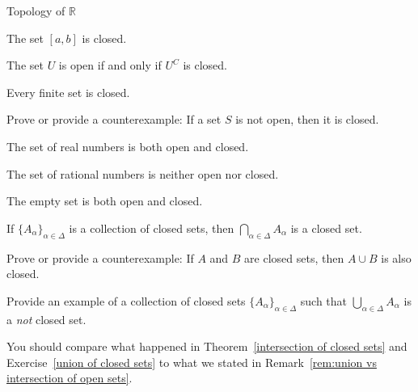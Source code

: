 \begin{section}{Topology of $\mathbb{R}$}
\begin{exercise}
\end{exercise}

\begin{theorem}
The set $[a,b]$ is closed.
\end{theorem}

\begin{theorem}
The set $U$ is open if and only if $U^C$ is closed.
\end{theorem}

\begin{theorem}
Every finite set is closed.
\end{theorem}

\begin{problem}
Prove or provide a counterexample: If a set $S$ is not open, then it is closed.
\end{problem}

\begin{theorem}
The set of real numbers is both open and closed.
\end{theorem}

\begin{theorem}
The set of rational numbers is neither open nor closed.
\end{theorem}

\begin{theorem}
The empty set is both open and closed.
\end{theorem}

\begin{theorem}\label{intersection of closed sets}
If $\{A_{\alpha}\}_{\alpha\in\Delta}$ is a collection of closed sets, then $\bigcap_{\alpha\in \Delta} A_{\alpha}$ is a closed set.
\end{theorem}

\begin{problem}
Prove or provide a counterexample: If $A$ and $B$ are closed sets, then $A\cup B$ is also closed.
\end{problem}

\begin{exercise}\label{union of closed sets}
Provide an example of a collection of closed sets $\{A_{\alpha}\}_{\alpha\in\Delta}$ such that $\bigcup_{\alpha\in \Delta} A_{\alpha}$ is a \emph{not} closed set.
\end{exercise}

\begin{remark}
You should compare what happened in Theorem~\ref{intersection of closed sets} and Exercise~\ref{union of closed sets} to what we stated in Remark~\ref{rem:union vs intersection of open sets}.
\end{remark}

\end{section}